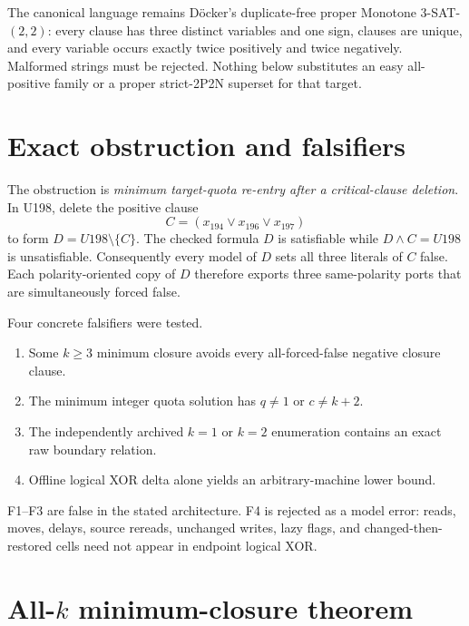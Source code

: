 \documentclass[11pt]{article}
\begin{document}
The canonical language remains D\"ocker's duplicate-free proper Monotone 3-SAT-$(2,2)$: every clause has three distinct variables and one sign, clauses are unique, and every variable occurs exactly twice positively and twice negatively.  Malformed strings must be rejected.  Nothing below substitutes an easy all-positive family or a proper strict-2P2N superset for that target.

\section{Exact obstruction and falsifiers}

The obstruction is \emph{minimum target-quota re-entry after a critical-clause deletion}.  In U198, delete the positive clause
\[
 C=(x_{194}\vee x_{196}\vee x_{197})
\]
to form $D=U198\setminus\{C\}$.  The checked formula $D$ is satisfiable while $D\wedge C=U198$ is unsatisfiable.  Consequently every model of $D$ sets all three literals of $C$ false.  Each polarity-oriented copy of $D$ therefore exports three same-polarity ports that are simultaneously forced false.

Four concrete falsifiers were tested.
\begin{enumerate}[label=F\arabic*.]
\item Some $k\geq3$ minimum closure avoids every all-forced-false negative closure clause.
\item The minimum integer quota solution has $q\neq1$ or $c\neq k+2$.
\item The independently archived $k=1$ or $k=2$ enumeration contains an exact raw boundary relation.
\item Offline logical XOR delta alone yields an arbitrary-machine lower bound.
\end{enumerate}
F1--F3 are false in the stated architecture.  F4 is rejected as a model error: reads, moves, delays, source rereads, unchanged writes, lazy flags, and changed-then-restored cells need not appear in endpoint logical XOR.

\section{All-$k$ minimum-closure theorem}
\end{document}
